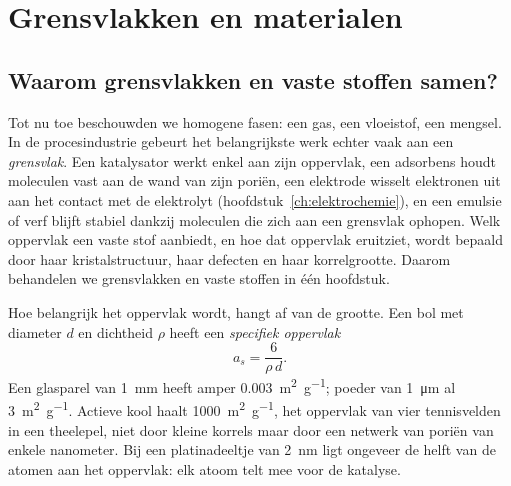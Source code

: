 \chapter{Grensvlakken en materialen}
\label{ch:grensvlakken}\label{ch:oppervlakte}\label{ch:vastestof}\label{ch:kristallografie}

\section{Waarom grensvlakken en vaste stoffen samen?}
\label{sec:grensvlakken-inleiding}

Tot nu toe beschouwden we homogene fasen: een gas, een vloeistof, een mengsel. In de procesindustrie gebeurt het belangrijkste werk echter vaak aan een \emph{grensvlak}. Een katalysator werkt enkel aan zijn oppervlak, een adsorbens houdt moleculen vast aan de wand van zijn poriën, een elektrode wisselt elektronen uit aan het contact met de elektrolyt (hoofdstuk~\ref{ch:elektrochemie}), en een emulsie of verf blijft stabiel dankzij moleculen die zich aan een grensvlak ophopen. Welk oppervlak een vaste stof aanbiedt, en hoe dat oppervlak eruitziet, wordt bepaald door haar kristalstructuur, haar defecten en haar korrelgrootte. Daarom behandelen we grensvlakken en vaste stoffen in \'e\'en hoofdstuk.

Hoe belangrijk het oppervlak wordt, hangt af van de grootte. Een bol met diameter $d$ en dichtheid $\rho$ heeft een \emph{specifiek oppervlak}
\begin{equation}
a_s = \frac{6}{\rho\,d}.
\label{eq:specifiek-oppervlak}
\end{equation}
Een glasparel van \SI{1}{\milli\metre} heeft amper \SI{0.003}{\metre\squared\per\gram}; poeder van \SI{1}{\micro\metre} al \SI{3}{\metre\squared\per\gram}. Actieve kool haalt \SI{1000}{\metre\squared\per\gram}, het oppervlak van vier tennisvelden in een theelepel, niet door kleine korrels maar door een netwerk van poriën van enkele nanometer. Bij een platinadeeltje van \SI{2}{\nano\metre} ligt ongeveer de helft van de atomen aan het oppervlak: elk atoom telt mee voor de katalyse.

